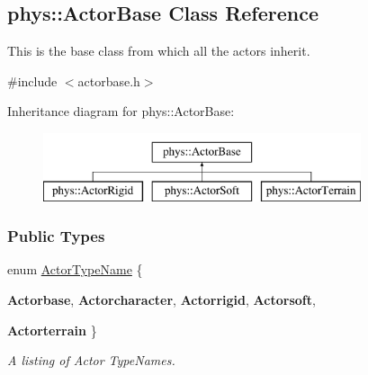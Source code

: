 \hypertarget{classphys_1_1ActorBase}{
\subsection{phys::ActorBase Class Reference}
\label{classphys_1_1ActorBase}
}


This is the base class from which all the actors inherit.  




{\ttfamily \#include $<$actorbase.h$>$}

Inheritance diagram for phys::ActorBase:\begin{figure}[H]
\begin{center}
\leavevmode
\includegraphics[height=2.000000cm]{classphys_1_1ActorBase}
\end{center}
\end{figure}
\subsubsection*{Public Types}
\begin{DoxyCompactItemize}
\item 
enum \hyperlink{classphys_1_1ActorBase_aff3a7c464e8ce82576073f8f891434b7}{ActorTypeName} \{ \par
{\bfseries Actorbase}, 
{\bfseries Actorcharacter}, 
{\bfseries Actorrigid}, 
{\bfseries Actorsoft}, 
\par
{\bfseries Actorterrain}
 \}
\begin{DoxyCompactList}\small\item\em A listing of Actor TypeNames. \item\end{DoxyCompactList}\end{DoxyCompactItemize}
